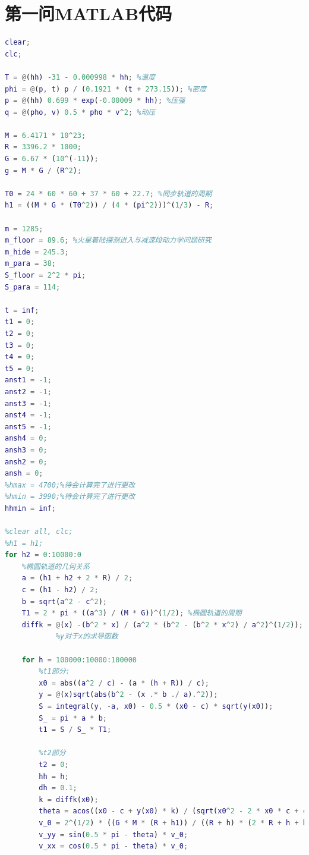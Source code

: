 \documentclass[hyperref,a4paper,UTF8]{ctexart}
\begin{document}
\section{第一问MATLAB代码}
\begin{lstlisting}[language=Matlab]
%经过多次变步长，可以得到以下代码
clear;
clc;

T = @(hh) -31 - 0.000998 * hh; %温度
phi = @(p, t) p / (0.1921 * (t + 273.15)); %密度
p = @(hh) 0.699 * exp(-0.00009 * hh); %压强
q = @(pho, v) 0.5 * pho * v^2; %动压

M = 6.4171 * 10^23;
R = 3396.2 * 1000;
G = 6.67 * (10^(-11));
g = M * G / (R^2);

T0 = 24 * 60 * 60 + 37 * 60 + 22.7; %同步轨道的周期
h1 = ((M * G * (T0^2)) / (4 * (pi^2)))^(1/3) - R;

m = 1285;
m_floor = 89.6; %火星着陆探测进入与减速段动力学问题研究
m_hide = 245.3;
m_para = 38;
S_floor = 2^2 * pi;
S_para = 114;

t = inf;
t1 = 0;
t2 = 0;
t3 = 0;
t4 = 0;
t5 = 0;
anst1 = -1;
anst2 = -1;
anst3 = -1;
anst4 = -1;
anst5 = -1;
ansh4 = 0;
ansh3 = 0;
ansh2 = 0;
ansh = 0;
%hmax = 4700;%待会计算完了进行更改
%hmin = 3990;%待会计算完了进行更改
hhmin = inf;

%clear all, clc;
%h1 = h1;
for h2 = 0:10000:0
    %椭圆轨道的几何关系
    a = (h1 + h2 + 2 * R) / 2;
    c = (h1 - h2) / 2;
    b = sqrt(a^2 - c^2);
    T1 = 2 * pi * ((a^3) / (M * G))^(1/2); %椭圆轨道的周期
    diffk = @(x) -(b^2 * x) / (a^2 * (b^2 - (b^2 * x^2) / a^2)^(1/2));
            %y对于x的求导函数

    for h = 100000:10000:100000
        %t1部分:
        x0 = abs((a^2 / c) - (a * (h + R)) / c);
        y = @(x)sqrt(abs(b^2 - (x .* b ./ a).^2));
        S = integral(y, -a, x0) - 0.5 * (x0 - c) * sqrt(y(x0));
        S_ = pi * a * b;
        t1 = S / S_ * T1;

        %t2部分
        t2 = 0;
        hh = h;
        dh = 0.1;
        k = diffk(x0);
        theta = acos((x0 - c + y(x0) * k) / (sqrt(x0^2 - 2 * x0 * c + c^2 + y(x0)^2) * sqrt(1 + k^2))) - pi / 18;
        v_0 = 2^(1/2) * ((G * M * (R + h1)) / ((R + h) * (2 * R + h + h1)))^(1/2);
        v_yy = sin(0.5 * pi - theta) * v_0;
        v_xx = cos(0.5 * pi - theta) * v_0;


\end{lstlisting}
\end{document}
